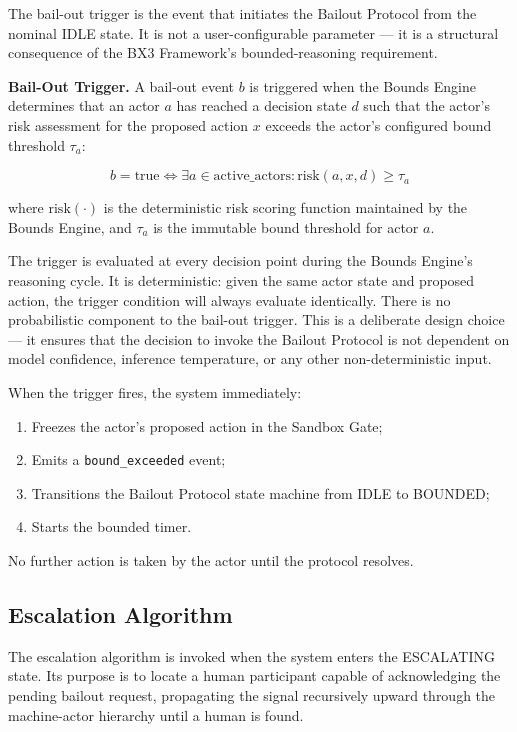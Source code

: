 The bail-out trigger is the event that initiates the Bailout Protocol from the nominal IDLE state. It is not a user-configurable parameter --- it is a structural consequence of the BX3 Framework's bounded-reasoning requirement.

\begin{definition}
\textbf{Bail-Out Trigger.} A bail-out event $b$ is triggered when the Bounds Engine determines that an actor $a$ has reached a decision state $d$ such that the actor's risk assessment for the proposed action $x$ exceeds the actor's configured bound threshold $\tau_a$:

\[
b = \text{true} \iff \exists a \in \text{active\_actors}: \text{risk}(a, x, d) \geq \tau_a
\]

where $\text{risk}(\cdot)$ is the deterministic risk scoring function maintained by the Bounds Engine, and $\tau_a$ is the immutable bound threshold for actor $a$.
\end{definition}

The trigger is evaluated at every decision point during the Bounds Engine's reasoning cycle. It is deterministic: given the same actor state and proposed action, the trigger condition will always evaluate identically. There is no probabilistic component to the bail-out trigger. This is a deliberate design choice --- it ensures that the decision to invoke the Bailout Protocol is not dependent on model confidence, inference temperature, or any other non-deterministic input.

When the trigger fires, the system immediately:
\begin{enumerate}
    \item Freezes the actor's proposed action in the Sandbox Gate;
    \item Emits a \texttt{bound\_exceeded} event;
    \item Transitions the Bailout Protocol state machine from IDLE to BOUNDED;
    \item Starts the bounded timer.
\end{enumerate}

No further action is taken by the actor until the protocol resolves.

\subsection{Escalation Algorithm}
\label{sec:escalation_algorithm}

The escalation algorithm is invoked when the system enters the ESCALATING state. Its purpose is to locate a human participant capable of acknowledging the pending bailout request, propagating the signal recursively upward through the machine-actor hierarchy until a human is found.

